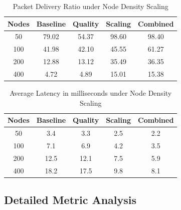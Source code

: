 \documentclass[a4paper,fleqn]{cas-dc}
\numberwithin{equation}{section}
\begin{document}
\begin{table}[htbp]
\caption{Packet Delivery Ratio under Node Density Scaling}
\label{tab_pdr}
\centering
\begin{tabular}{|c|c|c|c|c|}
\hline
Nodes & Baseline & Quality & Scaling & Combined \\
\hline
50 & 79.02 & 54.37 & 98.60 & 98.40 \\
100 & 41.98 & 42.10 & 45.55 & 61.27 \\
200 & 12.88 & 13.12 & 35.49 & 36.35 \\
400 & 4.72 & 4.89 & 15.01 & 15.38 \\
\hline
\end{tabular}
\end{table}

\begin{table}[htbp]
\caption{Average Latency in milliseconds under Node Density Scaling}
\label{tab_lat}
\centering
\begin{tabular}{|c|c|c|c|c|}
\hline
Nodes & Baseline & Quality & Scaling & Combined \\
\hline
50 & 3.4 & 3.3 & 2.5 & 2.2 \\
100 & 7.1 & 6.9 & 4.2 & 3.5 \\
200 & 12.5 & 12.1 & 7.5 & 5.9 \\
400 & 18.2 & 17.5 & 9.8 & 8.1 \\
\hline
\end{tabular}
\end{table}

\begin{table}[htbp]
\caption{Throughput and Delivery Ratio under Traffic Intensity Scaling}
\label{tab_rate}
\centering
{}
\end{table}

\subsection{Detailed Metric Analysis}
\end{document}
